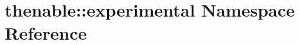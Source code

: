 \hypertarget{namespacethenable_1_1experimental}{}\section{thenable\+:\+:experimental Namespace Reference}
\label{namespacethenable_1_1experimental}
